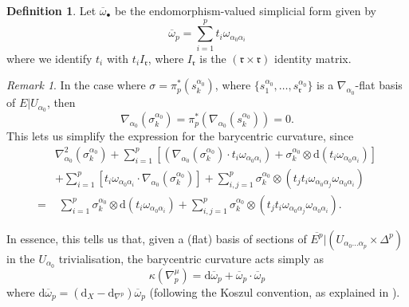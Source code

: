 \documentclass[11pt,fleqn]{article}
\theoremstyle{plain}
\theoremstyle{definition}
\newtheorem{definition}[theorem]{Definition}
\theoremstyle{remark}
\newtheorem{remark}[theorem]{Remark}
\numberwithin{equation}{theorem}
\newcommand{\restricted}{\mathbin{\big\vert}}
\renewcommand{\d}{\mathrm{d}}
\begin{document}
        \begin{definition}
            Let $\overline{\omega}_\bullet$ be the endomorphism-valued simplicial form given by
            \[
                \overline{\omega}_p
                =
                \sum_{i=1}^p t_i\omega_{\alpha_0\alpha_i}
            \]
            where we identify $t_i$ with $t_i I_\mathfrak{r}$, where $I_\mathfrak{r}$ is the $(\mathfrak{r}\times\mathfrak{r})$ identity matrix.
        \end{definition}

        \begin{remark}\label{remark:expression-for-barycentric-connection}
            In the case where $\sigma = \pi_p^*(s_k^{\alpha_0})$, where $\{s_1^{\alpha_0},\ldots,s_\mathfrak{r}^{\alpha_0}\}$ is a $\nabla_{\alpha_0}$-flat basis of $E\restricted U_{\alpha_0}$, then
            \[
                \nabla_{\alpha_0}\left(\sigma_k^{\alpha_0}\right)
                =
                \pi_p^*\left(\nabla_{\alpha_0}\left(s^{\alpha_0}_k\right)\right)
                =
                0.
            \]
            This lets us simplify the expression for the barycentric curvature, since
            \begin{align*}
                & \nabla_{\alpha_0}^2\left(\sigma_k^{\alpha_0}\right) + \sum_{i=1}^p\left[\left(\nabla_{\alpha_0}\left(\sigma_k^{\alpha_0}\right)\cdot t_i\omega_{\alpha_0\alpha_i}\right)+\sigma_k^{\alpha_0}\otimes\d(t_i\omega_{\alpha_0\alpha_i})\right]
            \\  & +\sum_{i=1}^p\left[t_i\omega_{\alpha_0\alpha_i}\cdot\nabla_{\alpha_0}\left(\sigma_k^{\alpha_0}\right)\right] + \sum_{i,j=1}^p\sigma_k^{\alpha_0}\otimes\left(t_jt_i\omega_{\alpha_0\alpha_j}\omega_{\alpha_0\alpha_i}\right)
            \\  =& \,\,\sum_{i=1}^p\sigma_k^{\alpha_0}\otimes\d(t_i\omega_{\alpha_0\alpha_i}) + \sum_{i,j=1}^p\sigma_k^{\alpha_0}\otimes\left(t_jt_i\omega_{\alpha_0\alpha_j}\omega_{\alpha_0\alpha_i}\right).
            \end{align*}

            In essence, this tells us that, given a (flat) basis of sections of $\overline{E^p} \restricted (U_{\alpha_0\ldots\alpha_p}\times\Delta^p)$ in the $U_{\alpha_0}$ trivialisation, the barycentric curvature acts simply as
            \[
                \kappa\left(\nabla_p^\mu\right)
                =
                \d\overline{\omega}_p + \overline{\omega}_p\cdot\overline{\omega}_p
            \]
            where $\d\overline{\omega}_p = (\d_X - \d_{\nabla^p})\overline{\omega}_p$ (following the Koszul convention, as explained in \cite[Definition~2.3.1]{Hosgood2020a}).
        \end{remark}
\end{document}
